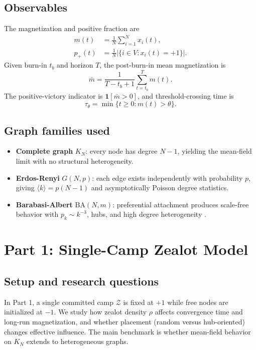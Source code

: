 \documentclass[12pt, a4paper]{article}
\begin{document}
\subsection{Observables}
The magnetization and positive fraction are
\begin{align}
m(t) &= \frac{1}{N}\sum_{i=1}^N x_i(t), \label{eq:magnetization}\\
p_+(t) &= \frac{1}{N}\left|\{i\in V: x_i(t)=+1\}\right|. \label{eq:pplus}
\end{align}
Given burn-in $t_b$ and horizon $T$, the post-burn-in mean magnetization is
\begin{equation}\label{eq:mbar}
\bar{m}=\frac{1}{T-t_b+1}\sum_{t=t_b}^T m(t).
\end{equation}
The positive-victory indicator is $\mathbf{1}[\bar{m}>0]$, and threshold-crossing time is
\begin{equation}\label{eq:tau_theta}
\tau_\theta = \min\{t\ge 0: m(t)>\theta\}.
\end{equation}

\subsection{Graph families used}
\begin{itemize}
\item \textbf{Complete graph} $K_N$: every node has degree $N-1$, yielding the mean-field limit with no structural heterogeneity.
\item \textbf{Erdos-Renyi} $G(N,p)$: each edge exists independently with probability $p$, giving $\langle k\rangle=p(N-1)$ and asymptotically Poisson degree statistics.
\item \textbf{Barabasi-Albert} $\mathrm{BA}(N,m)$: preferential attachment produces scale-free behavior with $p_k\sim k^{-3}$, hubs, and high degree heterogeneity \cite{barabasi1999,erdos1959}.
\end{itemize}

\section{Part 1: Single-Camp Zealot Model}\label{sec:part1}
\subsection{Setup and research questions}
In Part 1, a single committed camp $\mathcal{Z}$ is fixed at $+1$ while free nodes are initialized at $-1$. We study how zealot density $\rho$ affects convergence time and long-run magnetization, and whether placement (random versus hub-oriented) changes effective influence. The main benchmark is whether mean-field behavior on $K_N$ extends to heterogeneous graphs.
\end{document}

